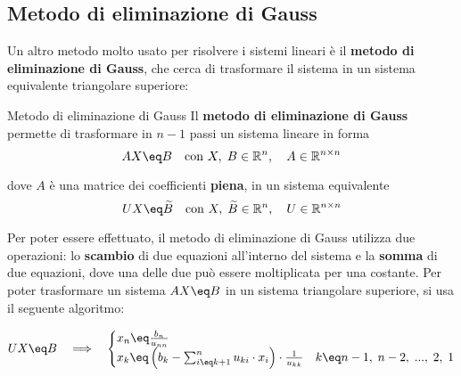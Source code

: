 \subsection{Metodo di eliminazione di Gauss}

Un altro metodo molto usato per risolvere i sistemi lineari è il \textbf{metodo di eliminazione di Gauss}, che cerca di trasformare il sistema in un sistema equivalente triangolare superiore:

\begin{definition}{Metodo di eliminazione di Gauss}
    Il \textbf{metodo di eliminazione di Gauss} permette di trasformare in $n - 1$ passi un sistema lineare in forma
    \[ A X \eq B \quad \text{con } X, \; B \in \mathbb{R}^n, \quad A \in \mathbb{R}^{n \times n} \]

    dove $A$ è una matrice dei coefficienti \textbf{piena}, in un sistema equivalente
    \[ U X \eq \widetilde{B} \quad \text{con } X, \; \widetilde{B} \in \mathbb{R}^n, \quad U \in \mathbb{R}^{n \times n} \]
\end{definition}

Per poter essere effettuato, il metodo di eliminazione di Gauss utilizza due operazioni: lo \textbf{scambio} di due equazioni all'interno del sistema e la \textbf{somma} di due equazioni, dove una delle due può essere moltiplicata per una costante.
\nwl
Per poter trasformare un sistema $AX \eq B$ in un sistema triangolare superiore, si usa il seguente algoritmo:

\[ UX \eq B \quad \Longrightarrow \quad \begin{cases}
    x_n \eq \frac{b_n}{u_{nn}} & \\
    x_k \eq \left( b_k - \sum_{i \eq k + 1}^n u_{ki} \cdot x_i \right) \cdot \frac{1}{u_{kk}} & k \eq n - 1, \; n - 2, \; ..., \; 2, \; 1
\end{cases} \]